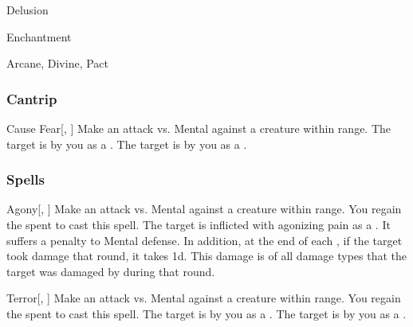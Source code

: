 \newpage
\begin{spellsection}{Delusion}

\begin{spellheader}
\end{spellheader}


 Enchantment

 Arcane, Divine, Pact

\subsubsection{Cantrip}


\begin{freeability}{Cause Fear}[, ]
Make an attack vs. Mental against a creature within \rngmed range.
\hit The target is  by you as a .
\crit The target is  by you as a .
\end{freeability}

\end{spellsection}


\subsubsection{Spells}


\lowercase{\hypertarget{spell:Agony}{}}\label{spell:Agony}
\begin{apability}[\nth{1}]{\hypertarget{spell:Agony}{Agony}}[, ]
Make an attack vs. Mental against a creature within \rngmed range.
\miss You regain the  spent to cast this spell.
\hit The target is inflicted with agonizing pain as a .
It suffers a  penalty to Mental defense.
In addition, at the end of each , if the target took damage that round, it takes  \minus1d.
This damage is of all damage types that the target was damaged by during that round.
\end{apability}
\vspace{0.25em}



\lowercase{\hypertarget{spell:Terror}{}}\label{spell:Terror}
\begin{apability}[\nth{1}]{\hypertarget{spell:Terror}{Terror}}[, ]
Make an attack vs. Mental against a creature within \rngmed range.
\miss You regain the  spent to cast this spell.
\hit The target is \frightened by you as a .
\crit The target is \panicked by you as a .
\end{apability}
\vspace{0.25em}




